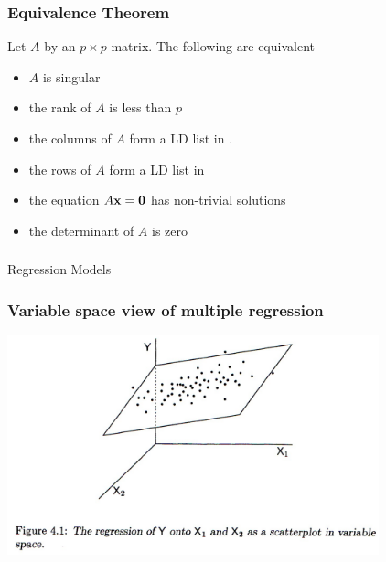 \documentclass{beamer}
\begin{document}
\begin{frame}
  \frametitle{Equivalence Theorem}
Let $A$ by an $p \times p$ matrix. The following are equivalent
\medskip

\begin{itemize}
	\item $A$ is singular
	\item the rank of $A$ is less than $p$
	\item the columns of $A$ form a LD list in \RealN.
	\item the rows of $A$ form a LD list in \RealN
	\item the equation $A\mathbf{x} = \mathbf{0}$ has non-trivial solutions
	\item the determinant of $A$ is zero 
\end{itemize}

\end{frame}


\begin{frame}
  \frametitle{}

\begin{center}
\begin{Huge}
Regression Models
\end{Huge}
\end{center}
\end{frame}

\begin{frame}[fragile]
  \frametitle{Variable space view of multiple regression}

\begin{center}
\includegraphics[height=2.5in]{regression-variable-space}
\end{center}  


\end{frame}
\end{document}
